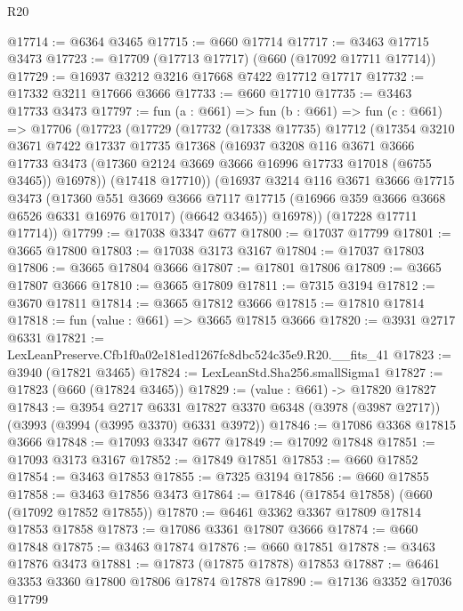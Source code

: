 \begin{lexlean}{R20}
\begin{coremodule}
@17714 := @6364 @3465
@17715 := @660 @17714
@17717 := @3463 @17715 @3473
@17723 := @17709 (@17713 @17717) (@660 (@17092 @17711 @17714))
@17729 := @16937 @3212 @3216 @17668 @7422 @17712 @17717
@17732 := @17332 @3211 @17666 @3666
@17733 := @660 @17710
@17735 := @3463 @17733 @3473
@17797 := fun (a : @661) =>
  fun (b : @661) =>
  fun (c : @661) =>
  @17706
    (@17723
      (@17729
        (@17732
          (@17338 @17735)
          @17712
          (@17354
            @3210
            @3671
            @7422
            @17337
            @17735
            @17368
            (@16937
              @3208
              @116
              @3671
              @3666
              @17733
              @3473
              (@17360 @2124 @3669 @3666 @16996 @17733 @17018 (@6755 @3465))
              @16978))
          (@17418 @17710))
        (@16937
          @3214
          @116
          @3671
          @3666
          @17715
          @3473
          (@17360
            @551
            @3669
            @3666
            @7117
            @17715
            (@16966 @359 @3666 @3668 @6526 @6331 @16976 @17017)
            (@6642 @3465))
          @16978))
      (@17228 @17711 @17714))
@17799 := @17038 @3347 @677
@17800 := @17037 @17799
@17801 := @3665 @17800
@17803 := @17038 @3173 @3167
@17804 := @17037 @17803
@17806 := @3665 @17804 @3666
@17807 := @17801 @17806
@17809 := @3665 @17807 @3666
@17810 := @3665 @17809
@17811 := @7315 @3194
@17812 := @3670 @17811
@17814 := @3665 @17812 @3666
@17815 := @17810 @17814
@17818 := fun (value : @661) => @3665 @17815 @3666
@17820 := @3931 @2717 @6331
@17821 := LexLeanPreserve.Cfb1f0a02e181ed1267fc8dbc524c35e9.R20.__fits_41
@17823 := @3940 (@17821 @3465)
@17824 := LexLeanStd.Sha256.smallSigma1
@17827 := @17823 (@660 (@17824 @3465))
@17829 := (value : @661) -> @17820 @17827
@17843 := @3954
    @2717
    @6331
    @17827
    @3370
    @6348
    (@3978 (@3987 @2717))
    (@3993 (@3994 (@3995 @3370) @6331 @3972))
@17846 := @17086 @3368 @17815 @3666
@17848 := @17093 @3347 @677
@17849 := @17092 @17848
@17851 := @17093 @3173 @3167
@17852 := @17849 @17851
@17853 := @660 @17852
@17854 := @3463 @17853
@17855 := @7325 @3194
@17856 := @660 @17855
@17858 := @3463 @17856 @3473
@17864 := @17846 (@17854 @17858) (@660 (@17092 @17852 @17855))
@17870 := @6461 @3362 @3367 @17809 @17814 @17853 @17858
@17873 := @17086 @3361 @17807 @3666
@17874 := @660 @17848
@17875 := @3463 @17874
@17876 := @660 @17851
@17878 := @3463 @17876 @3473
@17881 := @17873 (@17875 @17878) @17853
@17887 := @6461 @3353 @3360 @17800 @17806 @17874 @17878
@17890 := @17136 @3352 @17036 @17799

\end{coremodule}
\end{lexlean}
